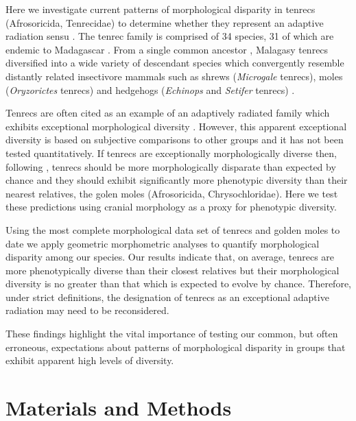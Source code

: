 \documentclass[12pt,a4paper]{article}
\begin{document}
Here we investigate current patterns of morphological disparity in tenrecs (Afrosoricida, Tenrecidae) to determine whether they represent an adaptive radiation sensu \citep{Losos2010a}. The tenrec family is comprised of 34 species, 31 of which are endemic to Madagascar \citep{Olson2013}. From a single common ancestor \citep{Asher2006}, Malagasy tenrecs diversified into a wide variety of descendant species which convergently resemble distantly related insectivore mammals such as shrews (\textit{Microgale} tenrecs), moles (\textit{Oryzorictes} tenrecs) and hedgehogs (\textit{Echinops} and \textit{Setifer} tenrecs) \citep{Eisenberg1969}.

Tenrecs are often cited as an example of an adaptively radiated family which exhibits exceptional morphological diversity \citep{Soarimalala2011, Olson2003, Eisenberg1969}. However, this apparent exceptional diversity is based on subjective comparisons to other groups and it has not been tested quantitatively. If tenrecs are exceptionally morphologically diverse then, following \citep{Losos2010a}, tenrecs should be more morphologically disparate than expected by chance and they should exhibit significantly more phenotypic diversity than their nearest relatives, the golen moles (Afrosoricida, Chrysochloridae). Here we test these predictions using cranial morphology as a proxy for phenotypic diversity.



Using the most complete morphological data set of tenrecs and golden moles to date we apply geometric morphometric analyses \citep{Rohlf1993, Zelditch2012} to quantify morphological disparity among our species. Our results indicate that, on average, tenrecs are more phenotypically diverse than their closest relatives but their morphological diversity is no greater than that which is expected to evolve by chance.
Therefore, under strict definitions, the designation of tenrecs as an exceptional adaptive radiation may need to be reconsidered. 

These findings highlight the vital importance of testing our common, but often erroneous, expectations about patterns of morphological disparity in groups that exhibit apparent high levels of diversity. 

\section{Materials and Methods}
\end{document}
